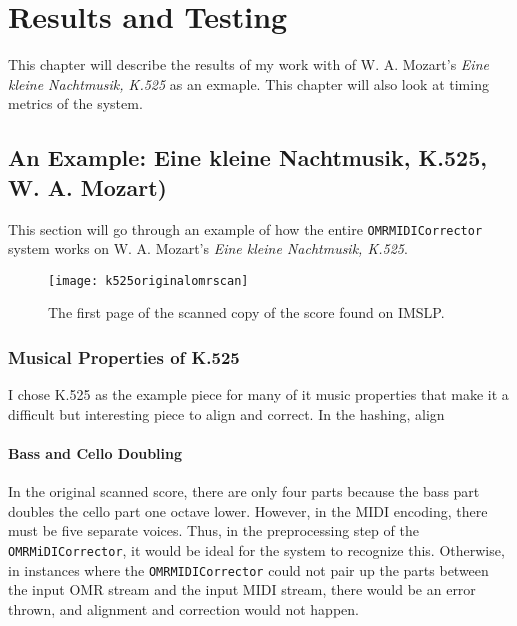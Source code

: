 \chapter{Results and Testing}
This chapter will describe the results of my work with of W. A. Mozart's \textit{Eine kleine Nachtmusik, K.525} as an exmaple. This chapter will also look at timing metrics of the system.

\section{An Example: Eine kleine Nachtmusik, K.525, W. A. Mozart)}
This section will go through an example of how the entire \texttt{OMRMIDICorrector} system works on W. A. Mozart's \textit{Eine kleine Nachtmusik, K.525}.

\begin{figure}[H]
\centering
\texttt{[image: k525originalomrscan]}
\caption{The first page of the scanned copy of the score found on IMSLP.}
\end{figure}

\subsection{Musical Properties of K.525}
I chose K.525 as the example piece for many of it music properties that make it a difficult but interesting piece to align and correct. In the hashing, align

\subsubsection{Bass and Cello Doubling}
In the original scanned score, there are only four parts because the bass part doubles the cello part one octave lower. However, in the MIDI encoding, there must be five separate voices. Thus, in the preprocessing step of the \texttt{OMRMiDICorrector}, it would be ideal for the system to recognize this. Otherwise, in instances where the \texttt{OMRMIDICorrector} could not pair up the parts between the input OMR stream and the input MIDI stream, there would be an error thrown, and alignment and correction would not happen. 

